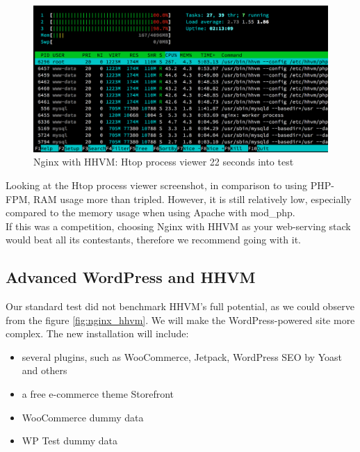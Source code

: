 \begin{figure}[H]
\begin{center}
\includegraphics[scale=0.5]{figures/Nginx_HHVM_24s.png}
\caption{Nginx with HHVM: Htop process viewer 22 seconds into test}
\label{fig:nginx_hhvm_24s}
\end{center}
\end{figure}

Looking at the Htop process viewer screenshot, in comparison to using PHP-FPM, RAM usage more than tripled. However, it is still relatively low, especially compared to the memory usage when using Apache with mod\_php. \\

If this was a competition, choosing Nginx with HHVM as your web-serving stack would beat all its contestants, therefore we recommend going with it.

\subsection{Advanced WordPress and HHVM}

Our standard test did not benchmark HHVM's full potential, as we could observe from the figure \ref{fig:nginx_hhvm}. We will make the WordPress-powered site more complex. The new installation will include:

\begin{itemize}
	\item several plugins, such as WooCommerce, Jetpack, WordPress SEO by Yoast and others \cite{WP_Ansible:group_vars}
	\item a free e-commerce theme Storefront \cite{WP:Storefront}
	\item WooCommerce dummy data
	\item WP Test dummy data \cite{WP:WP_Test-dummy-data}
\end{itemize}

